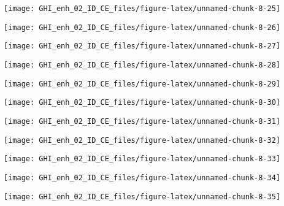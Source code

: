 \documentclass[
  10pt,
  a4paper,oneside]{article}
\begin{document}
\begin{center}\texttt{[image: GHI\_enh\_02\_ID\_CE\_files/figure-latex/unnamed-chunk-8-25]} \end{center}

\begin{center}\texttt{[image: GHI\_enh\_02\_ID\_CE\_files/figure-latex/unnamed-chunk-8-26]} \end{center}

\begin{center}\texttt{[image: GHI\_enh\_02\_ID\_CE\_files/figure-latex/unnamed-chunk-8-27]} \end{center}

\begin{center}\texttt{[image: GHI\_enh\_02\_ID\_CE\_files/figure-latex/unnamed-chunk-8-28]} \end{center}

\begin{center}\texttt{[image: GHI\_enh\_02\_ID\_CE\_files/figure-latex/unnamed-chunk-8-29]} \end{center}

\begin{center}\texttt{[image: GHI\_enh\_02\_ID\_CE\_files/figure-latex/unnamed-chunk-8-30]} \end{center}

\begin{center}\texttt{[image: GHI\_enh\_02\_ID\_CE\_files/figure-latex/unnamed-chunk-8-31]} \end{center}

\begin{center}\texttt{[image: GHI\_enh\_02\_ID\_CE\_files/figure-latex/unnamed-chunk-8-32]} \end{center}

\begin{center}\texttt{[image: GHI\_enh\_02\_ID\_CE\_files/figure-latex/unnamed-chunk-8-33]} \end{center}

\begin{center}\texttt{[image: GHI\_enh\_02\_ID\_CE\_files/figure-latex/unnamed-chunk-8-34]} \end{center}

\begin{center}\texttt{[image: GHI\_enh\_02\_ID\_CE\_files/figure-latex/unnamed-chunk-8-35]} \end{center}
\end{document}
